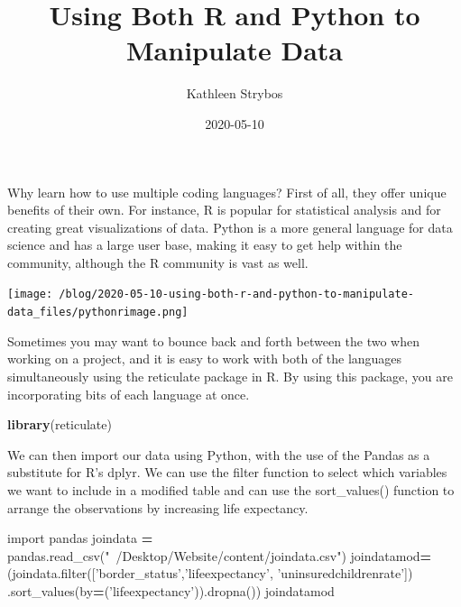 \documentclass[]{article}
\title{Using Both R and Python to Manipulate Data}
\author{Kathleen Strybos}
\date{2020-05-10}
\newenvironment{Shaded}{\begin{snugshade}}{\end{snugshade}}
\newcommand{\BuiltInTok}[1]{#1}
\newcommand{\ImportTok}[1]{#1}
\newcommand{\KeywordTok}[1]{\textcolor[rgb]{0.13,0.29,0.53}{\textbf{#1}}}
\newcommand{\NormalTok}[1]{#1}
\newcommand{\OperatorTok}[1]{\textcolor[rgb]{0.81,0.36,0.00}{\textbf{#1}}}
\newcommand{\StringTok}[1]{\textcolor[rgb]{0.31,0.60,0.02}{#1}}
\begin{document}
\maketitle

Why learn how to use multiple coding languages? First of all, they offer
unique benefits of their own. For instance, R is popular for statistical
analysis and for creating great visualizations of data. Python is a more
general language for data science and has a large user base, making it
easy to get help within the community, although the R community is vast
as well.

\texttt{[image: /blog/2020-05-10-using-both-r-and-python-to-manipulate-data\_files/pythonrimage.png]}

Sometimes you may want to bounce back and forth between the two when
working on a project, and it is easy to work with both of the languages
simultaneously using the reticulate package in R. By using this package,
you are incorporating bits of each language at once.

\begin{Shaded}
\begin{Highlighting}[]
\KeywordTok{library}\NormalTok{(reticulate)}
\end{Highlighting}
\end{Shaded}

We can then import our data using Python, with the use of the Pandas as
a substitute for R's dplyr. We can use the filter function to select
which variables we want to include in a modified table and can use the
sort\_values() function to arrange the observations by increasing life
expectancy.

\begin{Shaded}
\begin{Highlighting}[]
\ImportTok{import}\NormalTok{ pandas}
\NormalTok{joindata }\OperatorTok{=}\NormalTok{ pandas.read_csv(}\StringTok{"~/Desktop/Website/content/joindata.csv"}\NormalTok{)}
\NormalTok{joindatamod}\OperatorTok{=}\NormalTok{(joindata.}\BuiltInTok{filter}\NormalTok{([}\StringTok{'border_status'}\NormalTok{,}\StringTok{'lifeexpectancy'}\NormalTok{, }\StringTok{'uninsuredchildrenrate'}\NormalTok{])}
\NormalTok{  .sort_values(by}\OperatorTok{=}\NormalTok{(}\StringTok{'lifeexpectancy'}\NormalTok{)).dropna())}
\NormalTok{joindatamod}
\end{Highlighting}
\end{Shaded}
\end{document}
